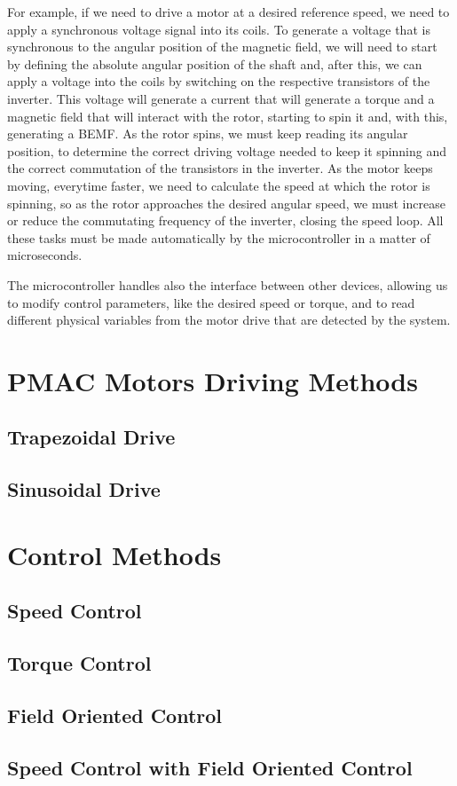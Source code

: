 For example, if we need to drive a motor at a desired reference speed, we need to apply a synchronous voltage signal into its coils. To generate a voltage that is synchronous to the angular position of the magnetic field, we will need to start by defining the absolute angular position of the shaft and, after this, we can apply a voltage into the coils by switching on the respective transistors of the inverter. This voltage will generate a current that will generate a torque and a magnetic field that will interact with the rotor, starting to spin it and, with this, generating a \ac{BEMF}. As the rotor spins, we must keep reading its angular position, to determine the correct driving voltage needed to keep it spinning and the correct commutation of the transistors in the inverter. As the motor keeps moving, everytime faster, we need to calculate the speed at which the rotor is spinning, so as the rotor approaches the desired angular speed, we must increase or reduce the commutating frequency of the inverter, closing the speed loop. All these tasks must be made automatically by the microcontroller in a matter of microseconds.

The microcontroller handles also the interface between other devices, allowing us to modify control parameters, like the desired speed or torque, and to read different physical variables from the motor drive that are detected by the system.

\section{PMAC Motors Driving Methods}\label{section:driving_methods}



\subsection{Trapezoidal Drive}

\subsection{Sinusoidal Drive}




\section{Control Methods}

\subsection{Speed Control}

\subsection{Torque Control}

\subsection{Field Oriented Control}

\subsection{Speed Control with Field Oriented Control}



